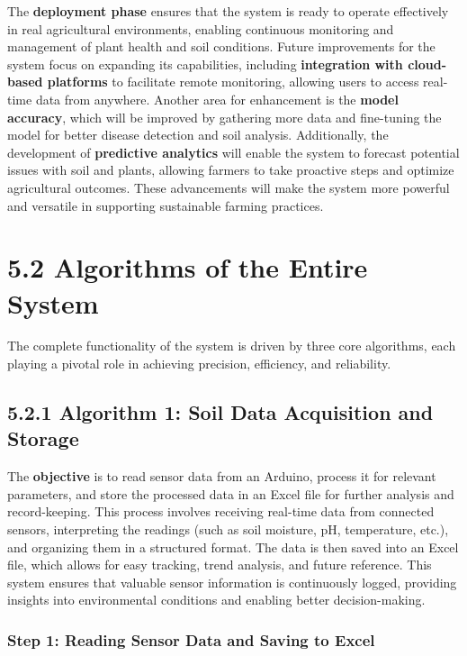 \documentclass{book} %
\begin{document}
\noindent The \textbf{deployment phase} ensures that the system is ready to operate effectively in real agricultural environments, enabling continuous monitoring and management of plant health and soil conditions. Future improvements for the system focus on expanding its capabilities, including \textbf{integration with cloud-based platforms} to facilitate remote monitoring, allowing users to access real-time data from anywhere. Another area for enhancement is the \textbf{model accuracy}, which will be improved by gathering more data and fine-tuning the model for better disease detection and soil analysis. Additionally, the development of \textbf{predictive analytics} will enable the system to forecast potential issues with soil and plants, allowing farmers to take proactive steps and optimize agricultural outcomes. These advancements will make the system more powerful and versatile in supporting sustainable farming practices.

\noindent 
\chapter{5.2 Algorithms of the Entire System}

\noindent The complete functionality of the system is driven by three core algorithms, each playing a pivotal role in achieving precision, efficiency, and reliability.

\noindent 
\section{5.2.1 Algorithm 1: Soil Data Acquisition and Storage}

\noindent The \textbf{objective} is to read sensor data from an Arduino, process it for relevant parameters, and store the processed data in an Excel file for further analysis and record-keeping. This process involves receiving real-time data from connected sensors, interpreting the readings (such as soil moisture, pH, temperature, etc.), and organizing them in a structured format. The data is then saved into an Excel file, which allows for easy tracking, trend analysis, and future reference. This system ensures that valuable sensor information is continuously logged, providing insights into environmental conditions and enabling better decision-making.

\noindent 
\subsection{Step 1: Reading Sensor Data and Saving to Excel}
\end{document}

